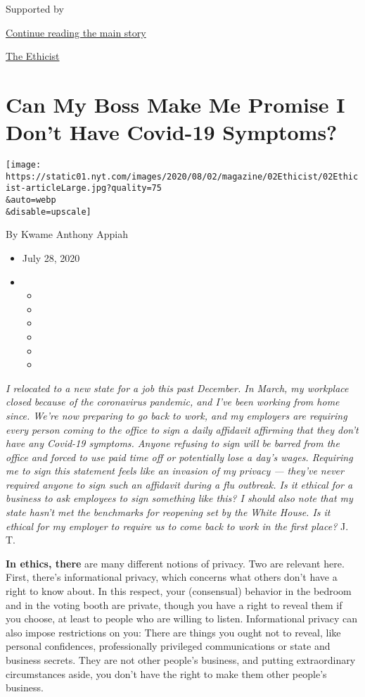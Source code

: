 Supported by

\protect\hyperlink{after-sponsor}{Continue reading the main story}

\href{/column/the-ethicist}{The Ethicist}

\hypertarget{can-my-boss-make-me-promise-i-dont-have-covid-19-symptoms}{%
\section{Can My Boss Make Me Promise I Don't Have Covid-19
Symptoms?}\label{can-my-boss-make-me-promise-i-dont-have-covid-19-symptoms}}

\texttt{[image: https://static01.nyt.com/images/2020/08/02/magazine/02Ethicist/02Ethicist-articleLarge.jpg?quality=75\\\&auto=webp\\\&disable=upscale]}

By Kwame Anthony Appiah

\begin{itemize}
\item
  July 28, 2020
\item
  \begin{itemize}
  \item
  \item
  \item
  \item
  \item
  \item
  \end{itemize}
\end{itemize}

\emph{I relocated to a new state for a job this past December. In March,
my workplace closed because of the coronavirus pandemic, and I've been
working from home since. We're now preparing to go back to work, and my
employers are requiring every person coming to the office to sign a
daily affidavit affirming that they don't have any Covid-19 symptoms.
Anyone refusing to sign will be barred from the office and forced to use
paid time off or potentially lose a day's wages. Requiring me to sign
this statement feels like an invasion of my privacy --- they've never
required anyone to sign such an affidavit during a flu outbreak. Is it
ethical for a business to ask employees to sign something like this? I
should also note that my state hasn't met the benchmarks for reopening
set by the White House. Is it ethical for my employer to require us to
come back to work in the first place?} J. T.

\textbf{In ethics, there} are many different notions of privacy. Two are
relevant here. First, there's informational privacy, which concerns what
others don't have a right to know about. In this respect, your
(consensual) behavior in the bedroom and in the voting booth are
private, though you have a right to reveal them if you choose, at least
to people who are willing to listen. Informational privacy can also
impose restrictions on you: There are things you ought not to reveal,
like personal confidences, professionally privileged communications or
state and business secrets. They are not other people's business, and
putting extraordinary circumstances aside, you don't have the right to
make them other people's business.

